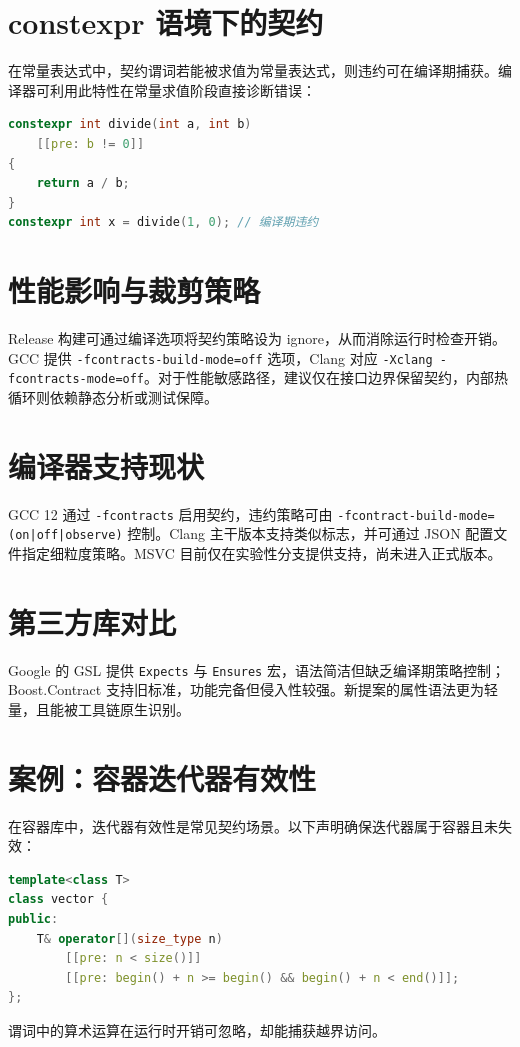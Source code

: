 \chapter{constexpr 语境下的契约}
在常量表达式中，契约谓词若能被求值为常量表达式，则违约可在编译期捕获。编译器可利用此特性在常量求值阶段直接诊断错误：\par
\begin{lstlisting}[language=cpp]
constexpr int divide(int a, int b)
    [[pre: b != 0]]
{
    return a / b;
}
constexpr int x = divide(1, 0); // 编译期违约
\end{lstlisting}
\chapter{性能影响与裁剪策略}
Release 构建可通过编译选项将契约策略设为 ignore，从而消除运行时检查开销。GCC 提供 \texttt{-fcontracts-build-mode=off} 选项，Clang 对应 \texttt{-Xclang -fcontracts-mode=off}。对于性能敏感路径，建议仅在接口边界保留契约，内部热循环则依赖静态分析或测试保障。\par
\chapter{编译器支持现状}
GCC 12 通过 \texttt{-fcontracts} 启用契约，违约策略可由 \texttt{-fcontract-build-mode=(on|off|observe)} 控制。Clang 主干版本支持类似标志，并可通过 JSON 配置文件指定细粒度策略。MSVC 目前仅在实验性分支提供支持，尚未进入正式版本。\par
\chapter{第三方库对比}
Google 的 GSL 提供 \texttt{Expects} 与 \texttt{Ensures} 宏，语法简洁但缺乏编译期策略控制；Boost.Contract 支持旧标准，功能完备但侵入性较强。新提案的属性语法更为轻量，且能被工具链原生识别。\par
\chapter{案例：容器迭代器有效性}
在容器库中，迭代器有效性是常见契约场景。以下声明确保迭代器属于容器且未失效：\par
\begin{lstlisting}[language=cpp]
template<class T>
class vector {
public:
    T& operator[](size_type n)
        [[pre: n < size()]]
        [[pre: begin() + n >= begin() && begin() + n < end()]];
};
\end{lstlisting}
谓词中的算术运算在运行时开销可忽略，却能捕获越界访问。\par
